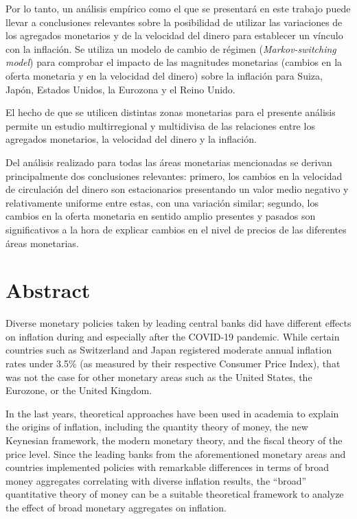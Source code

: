 \documentclass[titlepage, 12pt]{article}
\begin{document}
Por lo tanto, un análisis empírico como el que se presentará en este trabajo puede llevar a conclusiones relevantes sobre la posibilidad de utilizar las variaciones de los agregados monetarios y de la velocidad del dinero para establecer un vínculo con la inflación. Se utiliza un modelo de cambio de régimen (\textit{Markov-switching model}) para comprobar el impacto de las magnitudes monetarias (cambios en la oferta monetaria y en la velocidad del dinero) sobre la inflación para Suiza, Japón, Estados Unidos, la Eurozona y el Reino Unido.

El hecho de que se utilicen distintas zonas monetarias para el presente análisis permite un estudio multirregional y multidivisa de las relaciones entre los agregados monetarios, la velocidad del dinero y la inflación.

Del análisis realizado para todas las áreas monetarias mencionadas se derivan principalmente dos conclusiones relevantes: primero, los cambios en la velocidad de circulación del dinero son estacionarios presentando un valor medio negativo y relativamente uniforme entre estas, con una variación similar; segundo, los cambios en la oferta monetaria en sentido amplio presentes y pasados son significativos a la hora de explicar cambios en el nivel de precios de las diferentes áreas monetarias.

\newpage
\section*{Abstract}
Diverse monetary policies taken by leading central banks did have different effects on inflation during and especially after the COVID-19 pandemic. While certain countries such as Switzerland and Japan registered moderate annual inflation rates under 3.5\% (as measured by their respective Consumer Price Index), that was not the case for other monetary areas such as the United States, the Eurozone, or the United Kingdom.

In the last years, theoretical approaches have been used in academia to explain the origins of inflation, including the quantity theory of money, the new Keynesian framework, the modern monetary theory, and the fiscal theory of the price level. Since the leading banks from the aforementioned monetary areas and countries implemented policies with remarkable differences in terms of broad money aggregates correlating with diverse inflation results, the \enquote{broad} quantitative theory of money can be a suitable theoretical framework to analyze the effect of broad monetary aggregates on inflation.
\end{document}
